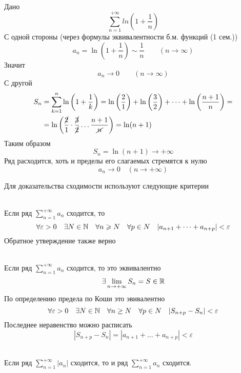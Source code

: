 \begin{Example}~\\
    Дано
	\[
        \sum^{+\infty}_{n=1}ln(1 + \frac{1}{n})
    \]
    С одной стороны (через формулы эквивалентности б.м. функций (1 сем.))
    \begin{equation*}
        a_n = \ln\left(1 + \frac{1}{n}\right) \sim \frac{1}{n} \qquad (n \rightarrow \infty)
    \end{equation*}
    Значит
    \[
        a_n \rightarrow 0 \qquad (n \rightarrow \infty)
    \]
    С другой
    \begin{align*}
        S_n &= \sum^{n}_{k=1}\ln\left(1 + \frac{1}{k}\right) = \ln\left(\frac{2}{1}\right) + \ln\left(\frac{3}{2}\right) + \dots + \ln\left(\frac{n + 1}{n}\right) =\\
        &= \ln\left(\frac{\cancel{2}}{1} \cdot \frac{\cancel{3}}{\cancel{2}} \dots \frac{n + 1}{\cancel{n}}\right) = \ln(n + 1)
    \end{align*}
    Таким образом
    \[
        S_n = \ln(n + 1) \rightarrow +\infty 
    \]
    Ряд расходится, хоть и пределы его слагаемых стремятся к нулю
    \[
        a_n \rightarrow 0 \quad (n \rightarrow +\infty)
    \]
\end{Example}

Для доказательства сходимости используют следующие критерии

\begin{Th}~\\
	Если ряд $\sum^{+\infty}_{n=1}a_n$ сходится, то
    \[
        \forall \varepsilon > 0 \quad \exists N \in \mathbb{N} \quad \forall n \geqslant N \quad \forall p \in N \quad |a_{n+1} + \dots + a_{n+p}| < \varepsilon
    \]
    Обратное утверждение также верно
\end{Th}

\begin{Proof}~\\
	Если ряд $\sum^{+\infty}_{n=1}a_n$ сходится, то это эквивалентно 
    \[
        \exists \lim_{n \rightarrow +\infty}S_n = S \in \mathbb{R}
    \]
    По определению предела по Коши это эвивалентно
    \[
        \forall \varepsilon > 0 \quad \exists N \in \mathbb{N} \quad \forall n \geq N \quad \forall p \in N \quad |S_{n+p} - S_n| < \varepsilon
    \]
    Последнее неравенство можно расписать
	\[
        |S_{n+p} - S_n| = |a_{n+1} + \dots + a_{n+p}| < \varepsilon
    \]
\end{Proof}

\begin{Th}~\\
	Если ряд $\sum^{+\infty}_{n=1}|a_n|$ сходится, то и ряд $\sum^{+\infty}_{n=1}a_n$ сходится.
\end{Th}

